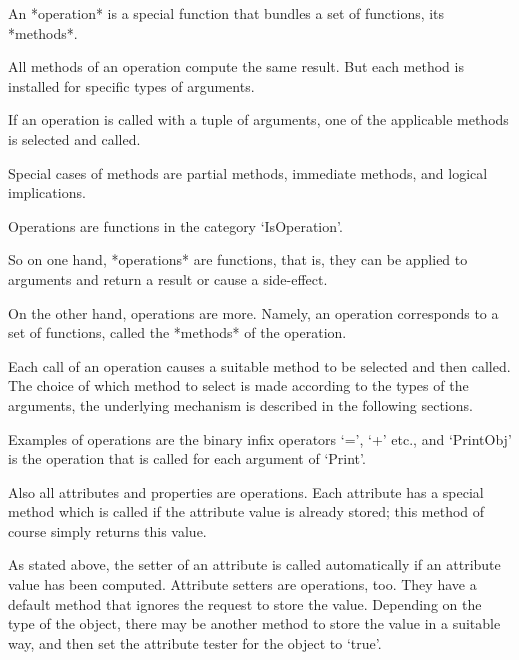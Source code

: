 

An *operation* is a special {\GAP} function that bundles a set of
functions, its *methods*.

All methods of an operation compute the same result.
But each method is installed for specific types of arguments.

If an operation is called with a tuple of arguments,
one of the applicable methods is selected and called.

Special cases of methods are partial methods, immediate methods,
and logical implications.


Operations are functions in the category `IsOperation'.

So on one hand, *operations* are {\GAP} functions, that is,
they can be applied to arguments and return a result or cause a
side-effect.

On the other hand, operations are more.
Namely, an operation corresponds to a set of {\GAP} functions,
called the *methods* of the operation.

Each call of an operation causes a suitable method to be selected
and then called.
The choice of which method to select is made according to the types
of the arguments,
the underlying mechanism is described in the following sections.

Examples of operations are the binary infix operators `=', `+' etc.,
and `PrintObj' is the operation that is called for each argument of
`Print'.

Also all attributes and properties are operations.
Each attribute has a special method which is called
if the attribute value is already stored;
this method of course simply returns this value.

As stated above, the setter of an attribute is called automatically
if an attribute value has been computed.
Attribute setters are operations, too.
They have a default method that ignores the request to store the value.
Depending on the type of the object,
there may be another method to store the value in a suitable way,
and then set the attribute tester for the object to `true'.


